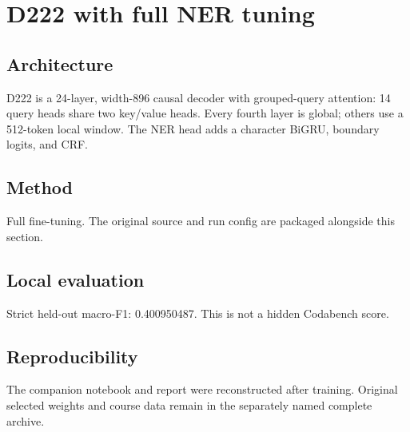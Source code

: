 \section{D222 with full NER tuning}
\subsection{Architecture}
D222 is a 24-layer, width-896 causal decoder with grouped-query attention: 14 query heads share two key/value heads. Every fourth layer is global; others use a 512-token local window. The NER head adds a character BiGRU, boundary logits, and CRF.
\subsection{Method}
Full fine-tuning. The original source and run config are packaged alongside this section.
\subsection{Local evaluation}
Strict held-out macro-F1: 0.400950487. This is not a hidden Codabench score.
\subsection{Reproducibility}
The companion notebook and report were reconstructed after training. Original selected weights and course data remain in the separately named complete archive.
